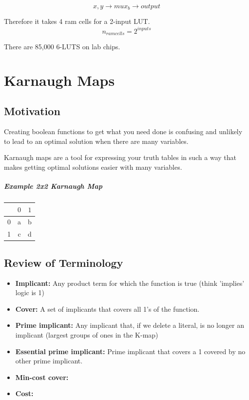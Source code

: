\documentclass[a4paper,12pt]{report}
\begin{document}
$${x, y} \to mux_{b} \to output$$

Therefore it takes 4 ram cells for a 2-input LUT. $$n_{ramcells} = 2^{inputs}$$

There are 85,000 6-LUTS on lab chips.

\chapter{Karnaugh Maps}
\section{Motivation}
Creating boolean functions to get what you need done is confusing and unlikely to lead to an optimal solution 
when there are many variables.

Karnaugh maps are a tool for expressing your truth tables in such a way that makes getting optimal solutions easier
with many variables.

\paragraph{Example 2x2 Karnaugh Map}
\begin{tabular}{l|cc}
& $0$ & $1$ \\
\hline
0 & a & b \\
1 & c & d \\
\end{tabular}


\section{Review of Terminology}

\begin{itemize}
\item \textbf{Implicant:} Any product term for which the function is true (think 'implies' logic is 1)
\item \textbf{Cover:} A set of implicants that covers all 1's of the function.
\item \textbf{Prime implicant:} Any implicant that, if we delete a literal, is no longer an implicant (largest
   groups of ones in the K-map)
\item \textbf{Essential prime implicant:} Prime implicant that covers a 1 covered by no other prime implicant.
\item \textbf{Min-cost cover:}
\item \textbf{Cost:}
\end{itemize}
\end{document}
